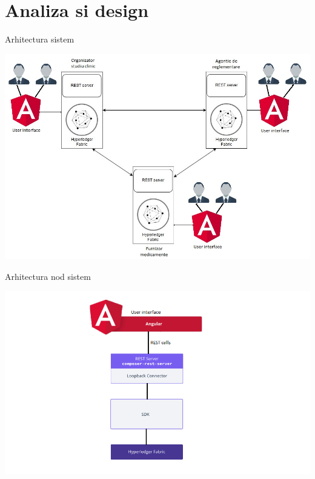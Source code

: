 \documentclass[10pt]{beamer}
\begin{document}
  \section{Analiza si design}
  \begin{frame}{Arhitectura sistem}
  	\begin{center}
  		\includegraphics[scale=0.42]{arh.jpg}
  	\end{center}
  \end{frame}
  \begin{frame}{Arhitectura nod sistem}
  	\begin{center}
  		\includegraphics[scale=0.42]{hyp_fab.PNG}
  	\end{center}
  \end{frame}
\end{document}
